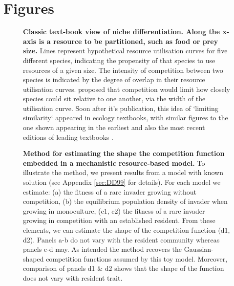 \documentclass[a4paper,11pt]{article}
\begin{document}
\section{Figures}

\begin{figure}[h]
  \centering
  \caption{\textbf{Classic text-book view of niche differentiation.
  Along the x-axis is a resource to be partitioned, such as food or prey size.} Lines
  represent hypothetical resource utilisation curves for five different species,
  indicating the propensity of that species to use resources of a given size.
  The intensity of competition between two species is indicated by the degree
  of overlap in their resource utilisation curves. \citet{MacArthur-1967} proposed
  that competition would limit how closely species could sit relative to one
  another, via the width of the utilisation curve. Soon after it's publication,
  this idea of `limiting similarity` appeared in ecology textbooks, with similar
  figures to the one shown appearing in the earliest and also the most recent
  editions of leading textbooks \citep{Begon-1986, Begon-2006, Krebs-1978, Krebs-2013,
  Ricklefs-1973, Ricklefs-1999}.}
  \label{fig:competition-kernels}
\end{figure}

\begin{figure}[h]
 \centering
 \caption{\textbf{Method for estimating the shape the competition function embedded
  in a mechanistic resource-based model.} To illustrate the method, we present
  results from a model with known solution \citep{Dieckmann-1999} (see Appendix
  \ref{sec:DD99} for details). For each
  model we estimate: (a) the fitness of a rare invader growing without competition,
  (b) the equilibrium population density of invader when growing in monoculture,
  (c1, c2) the fitness of a rare invader growing in competition with an established
  resident. From these elements, we can estimate the shape of the competition
  function (d1, d2). Panels a-b do not vary with the resident community whereas
  panels c-d may.  As intended the method recovers the Gaussian-shaped competition
  functions assumed by this toy model. Moreover, comparison of panels d1 \& d2
  shows that the shape of the function does not vary with resident trait.
  \label{fig:components}}
\end{figure}
\end{document}
